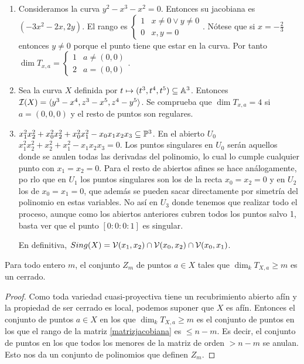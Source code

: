 \documentclass[ACGA.tex]{subfiles}
\begin{document}
\begin{ejs}
\begin{enumerate}
\item Consideramos la curva $y^2-x^3-x^2=0$. Entonces su jacobiana es $(-3x^2-2x, 2y)$. El rango es $\begin{cases}
1 & x\neq 0\lor y\neq 0\\
0 & x,y=0
\end{cases}$. Nótese que si $x=-\frac{2}{3}$ entonces $y\neq 0$ porque el punto tiene que estar en la curva.  Por tanto $\dim T_{x,a}=\begin{cases}
1 & a\neq(0,0)\\
2 & a=(0,0)
\end{cases}$.
\item Sea la curva $X$ definida por $t\mapsto (t^3,t^4,t^5)\subseteq\mathbb{A}^3$. Entonces $\mathcal{I}(X)=\langle y^3-x^4,z^3-x^5,z^4-y^5\rangle$. Se comprueba que $\dim T_{x,a}=4$ si $a=(0,0,0)$ y el resto de puntos son regulares.
\item $x_1^2x_2^2+x_0^2x_2^2+x_0^2x_1^2-x_0x_1x_2x_3\subseteq\mathbb{P}^3$. En el abierto $U_0$ $x_1^2x_2^2+x_2^2+x_1^2-x_1x_2x_3=0$. Los puntos singulares en $U_0$ serán aquellos donde se anulen todas las derivadas del polinomio, lo cual lo cumple cualquier punto con $x_1=x_2=0$. Para el resto de abiertos afines se hace análogamente, po rlo que en $U_1$ los puntos singulares son los de la recta $x_0=x_2=0$ y en $U_2$ los de $x_0=x_1=0$, que además se pueden sacar directamente por simetría del polinomio en estas variables. No así en $U_3$ donde tenemos que realizar todo el proceso, aunque como los abiertos anteriores cubren todos los puntos salvo 1, basta ver que el punto $[0:0:0:1]$ es singular. 

En definitiva, $Sing(X)=\mathcal{V}(x_1,x_2)\cap\mathcal{V}(x_0,x_2)\cap\mathcal{V}(x_0,x_1)$. 
\end{enumerate}
\end{ejs}

\begin{prop}
 Para todo entero $m$, el conjunto $Z_m$ de puntos $a\in X$ tales que $\dim_k T_{X,a}\geq m$ es un cerrado.
\end{prop}

\begin{proof}
 Como toda variedad cuasi-proyectiva tiene un recubrimiento abierto afín y la propiedad de ser cerrado es local, podemos suponer que $X$ es afín. Entonces el conjunto de puntos $a\in X$ en los que $\dim_k T_{X,a}\geq m$ es el conjunto de puntos en los que el rango de la matriz \ref{matrizjacobiana} es $\leq n-m$. Es decir, el conjunto de puntos en los que todos los menores de la matriz de orden $>n-m$ se anulan. Esto nos da un conjunto de polinomios que definen $Z_m$.
\end{proof}
\end{document}
